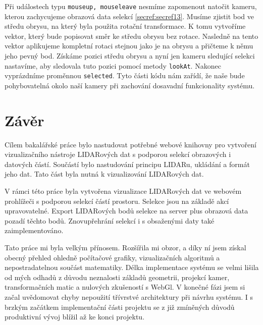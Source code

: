\documentclass[czech,bachelor,dept420,male,cpdeclaration]{diploma}
\begin{document}


Při událostech typu \texttt{mouseup, mouseleave} nesmíme zapomenout natočit kameru, kterou zachycujeme obrazová data selekcí \ref{secref:secref13}. Musíme zjistit bod ve středu obrysu, na který byla použita rotační transformace. K tomu vytvoříme vektor, který bude popisovat směr ke středu obrysu bez rotace. Nasledně na tento vektor aplikujeme kompletní rotaci stejnou jako je na obrysu a přičteme k němu jeho pevný bod. Získáme pozici středu obrysu a nyní jen kameru sledující selekci nastavíme, aby sledovala tuto pozici pomocí metody \texttt{lookAt}. Nakonec vyprázdníme proměnnou \texttt{selected}. Tyto části kódu nám zařídí, že naše bude pohybovatelná okolo naší kamery při zachování dosavadní funkcionality systému.


\section{Závěr}
Cílem bakalářské práce bylo nastudovat potřebné webové knihovny pro vytvoření vizualizačního nástroje LIDARových dat s podporou selekcí obrazových i datových částí. Součástí bylo nastudování principu LIDARu, ukládání a formát jeho dat. Tato část byla nutná k vizualizování LIDARových dat.

V rámci této práce byla vytvořena vizualizace LIDARových dat ve webovém prohlížeči s podporou selekcí částí prostoru. Selekce jsou na základě akcí upravovatelné. Export LIDARových bodů selekce na server plus obrazová data pozadí těchto bodů. Znovupřehrání selekcí i s obsaženými daty také zaimplementováno.

Tato práce mi byla velkým přínosem. Rozšířila mi obzor, a díky ní jsem získal obecný přehled ohledně počítačové grafiky, vizualizačních algoritmů a nepostradatelnou součást matematiky. Délka implementace systému se velmi lišila od mých odhadů z důvodu neznalosti základů geometrii, projekcí kamer, transformačních matic a nulových zkušeností s WebGl. V konečné fázi jsem si začal uvědomovat chyby nepoužití třívrstvé architektury při návrhu systému. I s brzkým začátkem implementační části projektu se z již zmíněných důvodů produktivní vývoj blížil až ke konci projektu.
 

\newpage
\nocite{*}
\renewcommand\refname{Literatura}
\end{document}

